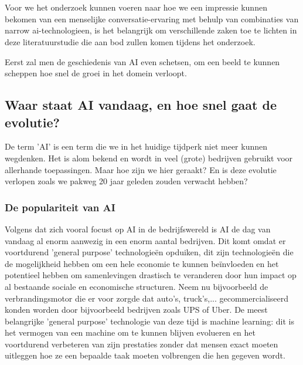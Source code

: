 \chapter{}
\label{ch:literatuurstudie}



Voor we het onderzoek kunnen voeren naar hoe we een impressie kunnen bekomen van een menselijke conversatie-ervaring met behulp van combinaties van narrow ai-technologieen, is het belangrijk om verschillende zaken toe te lichten in deze literatuurstudie die aan bod zullen komen tijdens het onderzoek.

Eerst zal men de geschiedenis van AI even schetsen, om een beeld te kunnen scheppen hoe snel de groei in het domein verloopt.

\section{Waar staat AI vandaag, en hoe snel gaat de evolutie?}
De term 'AI' is een term die we in het huidige tijdperk niet meer kunnen wegdenken. Het is alom bekend en wordt in veel (grote) bedrijven gebruikt voor allerhande toepassingen. Maar hoe zijn we hier geraakt? En is deze evolutie verlopen zoals we pakweg 20 jaar geleden zouden verwacht hebben?

\subsection{De populariteit van AI}
Volgens \cite{brynjolfsson2017artificial} dat zich vooral focust op AI in de bedrijfswereld is AI de dag van vandaag al enorm aanwezig in een enorm aantal bedrijven. Dit komt omdat er voortdurend 'general purpose' technologieën opduiken, dit zijn technologieën die de mogelijkheid hebben om een hele economie te kunnen beïnvloeden en het potentieel hebben om samenlevingen drastisch te veranderen door hun impact op al bestaande sociale en economische structuren. Neem nu bijvoorbeeld de verbrandingsmotor die er voor zorgde dat auto's, truck's,... gecommercialiseerd konden worden door bijvoorbeeld bedrijven zoals UPS of Uber. De meest belangrijke 'general purpose' technologie van deze tijd is machine learning: dit is het vermogen van een machine om te kunnen blijven evolueren en het voortdurend verbeteren van zijn prestaties zonder dat mensen exact moeten uitleggen hoe ze een bepaalde taak moeten volbrengen die hen gegeven wordt. 

